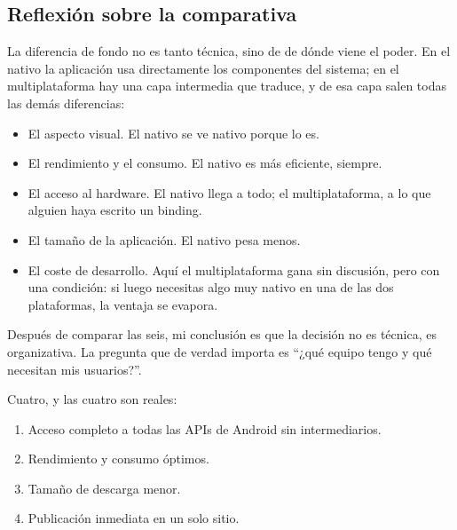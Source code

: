 \subsection{Reflexión sobre la comparativa}


La diferencia de fondo no es tanto técnica, sino de de dónde viene el poder. En el nativo la aplicación usa directamente los componentes del sistema; en el multiplataforma hay una capa intermedia que traduce, y de esa capa salen todas las demás diferencias:
\begin{itemize}[leftmargin=*,itemsep=0.2em,topsep=0.2em]
  \item El aspecto visual. El nativo se ve nativo porque lo es.
  \item El rendimiento y el consumo. El nativo es más eficiente, siempre.
  \item El acceso al hardware. El nativo llega a todo; el multiplataforma, a lo que alguien haya escrito un binding.
  \item El tamaño de la aplicación. El nativo pesa menos.
  \item El coste de desarrollo. Aquí el multiplataforma gana sin discusión, pero con una condición: si luego necesitas algo muy nativo en una de las dos plataformas, la ventaja se evapora.
\end{itemize}

Después de comparar las seis, mi conclusión es que la decisión no es técnica, es organizativa. La pregunta que de verdad importa es \enquote{¿qué equipo tengo y qué necesitan mis usuarios?}.


Cuatro, y las cuatro son reales:
\begin{enumerate}[leftmargin=*,itemsep=0.1em]
  \item Acceso completo a todas las APIs de Android sin intermediarios.
  \item Rendimiento y consumo óptimos.
  \item Tamaño de descarga menor.
  \item Publicación inmediata en un solo sitio.
\end{enumerate}


